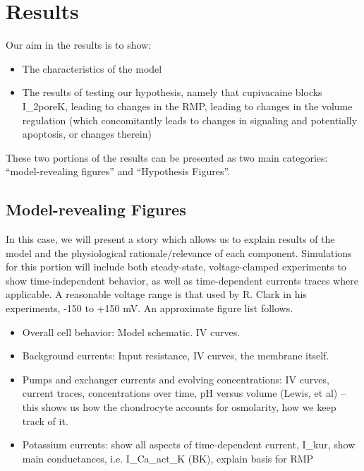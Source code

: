 \section{Results}
\label{results}

Our aim in the results is to show:
\begin{itemize}
\item{The characteristics of the model}
\item{The results of testing our hypothesis, namely that cupivacaine blocks I_2poreK, leading to changes in the RMP, leading to changes in the volume regulation (which concomitantly leads to changes in signaling and potentially apoptosis, or changes therein)} 
\end{itemize}


These two portions of the results can be presented as two main categories: ``model-revealing figures'' and ``Hypothesis Figures''.

\subsection{Model-revealing Figures}
In this case, we will present a story which allows us to explain results of the model and the physiological rationale/relevance of each component. Simulations for this portion will include both steady-state, voltage-clamped experiments to show time-independent behavior, as well as time-dependent currents traces where applicable. A reasonable voltage range is that used by R. Clark in his experiments, -150 to +150 mV. An approximate figure list follows.
\begin{itemize}
\item{Overall cell behavior: Model schematic. IV curves.}
\item{Background currents: Input resistance, IV curves, the membrane itself.}
\item{Pumps and exchanger currents and evolving concentrations: IV curves, current traces, concentrations over time, pH versus volume (Lewis, et al) -- this shows us how the chondrocyte accounts for osmolarity, how we keep track of it.}
\item{Potassium currents: show all aspects of time-dependent current, I_kur, show main conductances, i.e. I_Ca_act_K (BK), explain basis for RMP}
\end{itemize}

